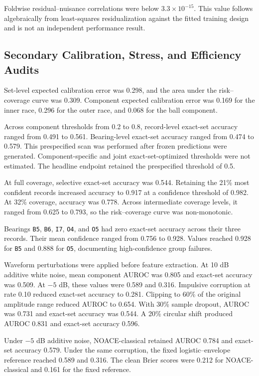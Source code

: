 \documentclass[machines,article,submit,oneauthor,pdftex]{Definitions/mdpi}
\begin{document}
Foldwise residual--nuisance correlations were below $3.3\times10^{-15}$. This value follows algebraically from least-squares residualization against the fitted training design and is not an independent performance result.

\subsection{Secondary Calibration, Stress, and Efficiency Audits}

Set-level expected calibration error was 0.298, and the area under the risk--coverage curve was 0.309. Component expected calibration error was 0.169 for the inner race, 0.296 for the outer race, and 0.068 for the ball component.

Across component thresholds from 0.2 to 0.8, record-level exact-set accuracy ranged from 0.491 to 0.561. Bearing-level exact-set accuracy ranged from 0.474 to 0.579. This prespecified scan was performed after frozen predictions were generated. Component-specific and joint exact-set-optimized thresholds were not estimated. The headline endpoint retained the prespecified threshold of 0.5.

At full coverage, selective exact-set accuracy was 0.544. Retaining the 21\% most confident records increased accuracy to 0.917 at a confidence threshold of 0.982. At 32\% coverage, accuracy was 0.778. Across intermediate coverage levels, it ranged from 0.625 to 0.793, so the risk--coverage curve was non-monotonic.

Bearings \texttt{B5}, \texttt{B6}, \texttt{I7}, \texttt{O4}, and \texttt{O5} had zero exact-set accuracy across their three records. Their mean confidence ranged from 0.756 to 0.928. Values reached 0.928 for \texttt{B5} and 0.888 for \texttt{O5}, documenting high-confidence group failures.

Waveform perturbations were applied before feature extraction. At 10 dB additive white noise, mean component AUROC was 0.805 and exact-set accuracy was 0.509. At $-5$ dB, these values were 0.589 and 0.316. Impulsive corruption at rate 0.10 reduced exact-set accuracy to 0.281. Clipping to 60\% of the original amplitude range reduced AUROC to 0.654. With 30\% sample dropout, AUROC was 0.731 and exact-set accuracy was 0.544. A 20\% circular shift produced AUROC 0.831 and exact-set accuracy 0.596.

Under $-5$ dB additive noise, NOACE-classical retained AUROC 0.784 and exact-set accuracy 0.579. Under the same corruption, the fixed logistic--envelope reference reached 0.589 and 0.316. The clean Brier scores were 0.212 for NOACE-classical and 0.161 for the fixed reference.
\end{document}
